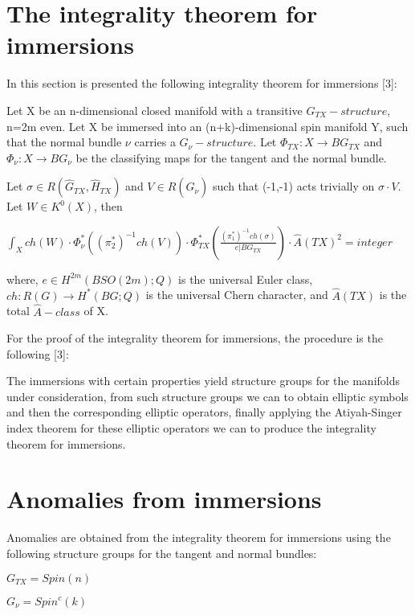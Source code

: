 \documentclass[a4paper,a4paper]{article}
\begin{document}
\section{The integrality theorem for immersions}
In this section is presented the following integrality theorem for immersions [3]:

Let X be an n-dimensional closed manifold with a transitive $G_{TX}-structure$, n=2m
even. Let X be immersed into an  (n+k)-dimensional spin manifold Y, such that the
normal bundle $\nu$ carries a $G_{\nu}-structure$. Let $\Phi_{TX}:
X\rightarrow{BG_{TX}}$  and $\Phi_{\nu}: X\rightarrow{BG_{\nu}}$ be the classifying
maps for the tangent and the normal bundle.

Let $\sigma \in {R(\hat{G}_{TX},\hat{H}_{TX})}$ and $V \in {R(\hat{G}_{\nu})}$ such
that (-1,-1) acts trivially on $\sigma\cdot{V}$.  Let  $W \in K^{0}(X)$, then

\begin{center}
\setlength{\baselineskip}{40pt}
 {  $
\int_{X}ch(W)\cdot{\Phi_{\nu}^{*}((\pi_{2}^{*})^{-1}ch(V))}\cdot{\Phi_{TX}^{*}(\frac{(\pi_{1}^{*})^{-1}ch(\sigma)}{e|BG_{TX}})}\cdot{\hat{A}(TX)^{2}}=integer$
}
\end{center}
where, $e\in H^{2m}(BSO(2m);Q)$ is the universal Euler class, $ch: R(G)\rightarrow
H^{*}(BG;Q)$ is the universal Chern character, and $\hat{A}(TX)$ is the total
$\hat{A}-class$ of X.

For the proof of the integrality theorem for immersions, the procedure is the
following [3]:

The immersions with certain properties yield structure groups for the manifolds under
consideration, from such structure groups we can to obtain elliptic symbols and then
the corresponding elliptic operators, finally applying the Atiyah-Singer index theorem
for these elliptic operators we can to produce the integrality theorem for immersions.

\section{Anomalies from immersions}

Anomalies are obtained from the integrality theorem for immersions using the following
structure groups for the tangent and normal bundles:

\begin{center}
\setlength{\baselineskip}{40pt}
 {  $
G_{TX}=Spin(n)$ }
\end{center}
\begin{center}
\setlength{\baselineskip}{40pt}
 {  $
G_{\nu}=Spin^{c}(k)$ }
\end{center}
\end{document}
